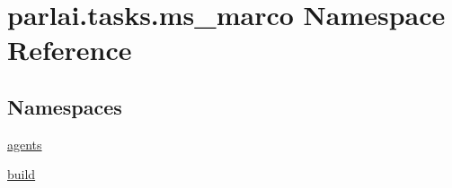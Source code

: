 \hypertarget{namespaceparlai_1_1tasks_1_1ms__marco}{}\section{parlai.\+tasks.\+ms\+\_\+marco Namespace Reference}
\label{namespaceparlai_1_1tasks_1_1ms__marco}
\subsection*{Namespaces}
\begin{DoxyCompactItemize}
\item 
 \hyperlink{namespaceparlai_1_1tasks_1_1ms__marco_1_1agents}{agents}
\item 
 \hyperlink{namespaceparlai_1_1tasks_1_1ms__marco_1_1build}{build}
\end{DoxyCompactItemize}
